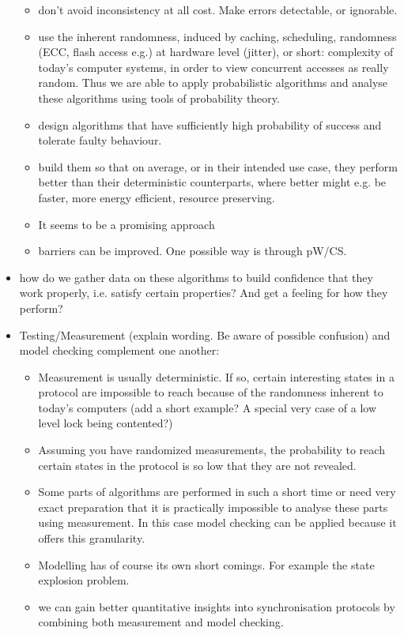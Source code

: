 \documentclass[a4paper, 10pt]{article}
\begin{document}
\begin{itemize}
\begin{itemize}
			\item don't avoid inconsistency at all cost. Make errors detectable, or ignorable.
			\item use the inherent randomness\cite{mcg09}, induced by caching, scheduling, randomness (ECC, flash access e.g.) at hardware level (jitter), or short: complexity of today's computer systems, in order to view concurrent accesses as really random. Thus we are able to apply probabilistic algorithms and analyse these algorithms using tools of probability theory.
			\item design algorithms that have sufficiently high probability of success and tolerate faulty behaviour.
			\item build them so that on average, or in their intended use case, they perform better than their deterministic counterparts, where better might e.g. be faster, more energy efficient, resource preserving.
			\item It seems to be a promising approach
			\item barriers can be improved. One possible way is through pW/CS.
		\end{itemize}
	\item how do we gather data on these algorithms to build confidence that they work properly, i.e. satisfy certain properties? And get a feeling for how they perform?
	\item Testing/Measurement (explain wording. Be aware of possible confusion) and model checking complement one another:
		\begin{itemize}
			\item Measurement is usually deterministic. If so, certain interesting states in a protocol are impossible to reach because of the randomness inherent to today's computers (add a short example? A special very case of a low level lock being contented?)
			\item Assuming you have randomized measurements, the probability to reach certain states in the protocol is so low that they are not revealed.
			\item Some parts of algorithms are performed in such a short time or need very exact preparation that it is practically impossible to analyse these parts using measurement. In this case model checking can be applied because it offers this granularity.
			\item Modelling has of course its own short comings. For example the state explosion problem.
			\item we can gain better quantitative insights into synchronisation protocols by combining both measurement and model checking.

\end{itemize}
\end{itemize}
\end{document}
